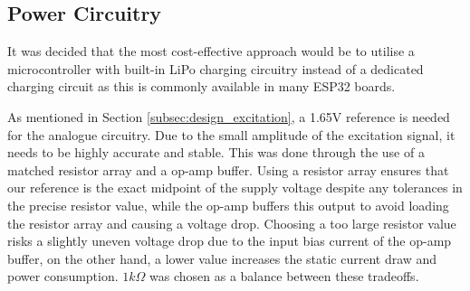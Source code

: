 \subsection{Power Circuitry}
 It was decided that the most cost-effective approach would be to utilise a microcontroller with built-in LiPo charging circuitry instead of a dedicated charging circuit as this is commonly available in many ESP32 boards.  

As mentioned in Section \ref{subsec:design_excitation}, a 1.65V reference is needed for the analogue circuitry. Due to the small amplitude of the excitation signal, it needs to be highly accurate and stable. This was done through the use of a matched resistor array and a op-amp buffer. Using a resistor array ensures that our reference is the exact midpoint of the supply voltage despite any tolerances in the precise resistor value, while the op-amp buffers this output to avoid loading the resistor array and causing a voltage drop. Choosing a too large resistor value risks a slightly uneven voltage drop due to the input bias current of the op-amp buffer, on the other hand, a lower value increases the static current draw and power consumption. $1k\Omega$ was chosen as a balance between these tradeoffs.

